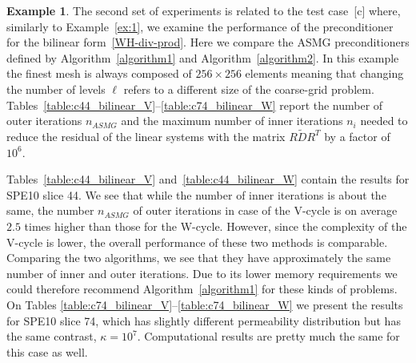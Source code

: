 \documentclass[11pt]{amsart}
\numberwithin{equation}{section}
\theoremstyle{definition}\newtheorem{example}{Example}[section]
\begin{document}
\begin{example} \label{ex:2} 
The second set of experiments is related to the test case~[c] where, similarly to 
Example~\ref{ex:1}, we examine the performance of the preconditioner for the bilinear
form~\eqref{WH-div-prod}.  Here we compare the ASMG preconditioners defined by
Algorithm~\ref{algorithm1} and Algorithm~\ref{algorithm2}. In this example the
finest mesh is always composed of $256\times 256$ elements meaning that changing
the number of levels $\ell$ refers to a different size of the coarse-grid problem.
Tables~\ref{table:c44_bilinear_V}--\ref{table:c74_bilinear_W} report the number
of outer iterations $n_{ASMG}$ and the maximum number of inner iterations $n_i$ needed
to reduce the residual of the linear systems with the matrix $R\widetilde{D}R^T$ by a
factor of~$10^6$.
\end{example}

Tables~\ref{table:c44_bilinear_V} and~\ref{table:c44_bilinear_W} contain the results
for SPE10 slice 44. We see that while the number of inner iterations is about the
same, the number $n_{ASMG}$ of outer iterations in case of the V-cycle is on average
$2.5$ times higher than those for the W-cycle. However, since the complexity of the V-cycle
is lower, the overall performance of these two methods is comparable. Comparing the
two algorithms, we see that they have approximately the same number of inner and outer
iterations. Due to its lower memory requirements we could therefore recommend
Algorithm~\ref{algorithm1} for these kinds of problems. 
On Tables \ref{table:c74_bilinear_V}--\ref{table:c74_bilinear_W}  we present the results
for SPE10 slice 74, which has slightly different permeability distribution but has
the same contrast, $\kappa=10^7$. Computational results are pretty much the same for
this case as well.
\end{document}
